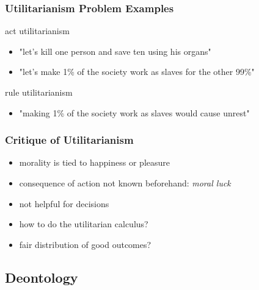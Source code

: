 \documentclass[dvipsnames]{beamer}
\theoremstyle{plain}
\begin{document}
\begin{frame}
  \frametitle{Utilitarianism Problem Examples}

  \begin{exampleblock}{act utilitarianism}
    \begin{itemize}
      \item "let's kill one person and save ten using his organs"
      \item "let's make 1\% of the society work as slaves for the other 99\%"
    \end{itemize}
  \end{exampleblock}

  \pause
  \begin{exampleblock}{rule utilitarianism}
    \begin{itemize}
      \item "making 1\% of the society work as slaves would cause unrest"
    \end{itemize}
  \end{exampleblock}
\end{frame}

\begin{frame}
  \frametitle{Critique of Utilitarianism}

  \begin{itemize}
    \item morality is tied to happiness or pleasure

    \pause
    \medskip
    \item consequence of action not known beforehand: \emph{moral luck}

    \pause
    \medskip
    \item not helpful for decisions
    \item how to do the utilitarian calculus?

    \pause
    \medskip
    \item fair distribution of good outcomes?
  \end{itemize}
\end{frame}

\subsection{Deontology}
\end{document}
